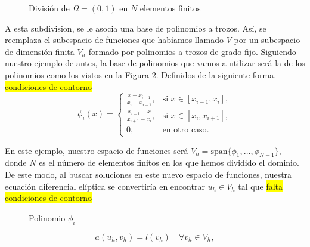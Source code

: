 \documentclass[a4paper,11pt,spanish, twoside, leqno]{tfg-uam}
\theoremstyle{definition}
\begin{document}
\begin{figure}
    \centering
    \label{fig:DivisionOmega}
    \caption{División de $\Omega = (0,1)$ en $N$ elementos finitos}
\end{figure}
A esta subdivision, se le asocia una base de polinomios a trozos. Así, se reemplaza el subespacio de funciones que habíamos llamado $V$ por un subespacio de dimensión finita $V_h$ formado por polinomios a trozos  de grado fijo. Siguiendo nuestro ejemplo de antes, la base de polinomios que vamos a utilizar será la de los polinomios como los vistos en la Figura \ref{fig:BasePolinomios}. Definidos de la siguiente forma. \colorbox{yellow}{condiciones de contorno}
\begin{equation*}
    \phi_i(x) = \begin{cases}
        \frac{x-x_{i-1}}{x_i-x_{i-1}}, & \text{si } x\in[x_{i-1},x_i],\\
        \frac{x_{i+1}-x}{x_{i+1}-x_i}, & \text{si } x\in[x_i,x_{i+1}],\\
        0, & \text{en otro caso}.
    \end{cases} 
\end{equation*}

En este ejemplo, nuestro espacio de funciones será $V_h = \text{span}\{\phi_1,\dots,\phi_{N-1}\}$, donde $N$ es el número de elementos finitos en los que hemos dividido el dominio. De este modo, al buscar soluciones en este nuevo espacio de funciones, nuestra ecuación diferencial elíptica se convertiría en encontrar $u_h\in V_h$ tal que \colorbox{yellow}{falta condiciones de contorno}
\begin{figure}
    \centering
    \label{fig:BasePolinomios}
    \caption{Polinomio $\phi_i$}
\end{figure}
\begin{equation*}
    a(u_h,v_h) = l(v_h) \quad \forall v_h\in V_h,
\end{equation*}
\end{document}

